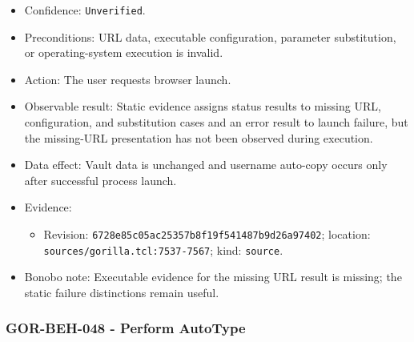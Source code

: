 \documentclass[
  letterpaper,
]{article}
\newcommand{\passthrough}[1]{#1}
\providecommand{\tightlist}{%
  \setlength{\itemsep}{0pt}\setlength{\parskip}{0pt}}
\begin{document}
\begin{itemize}
\tightlist
\item
  Confidence: \nolinkurl{Unverified}.
\item
  Preconditions: URL data, executable configuration, parameter substitution, or operating-system execution is invalid.
\item
  Action: The user requests browser launch.
\item
  Observable result: Static evidence assigns status results to missing URL, configuration, and substitution cases and an
  error result to launch failure, but the missing-URL presentation has not been observed during execution.
\item
  Data effect: Vault data is unchanged and username auto-copy occurs only after successful process launch.
\item
  Evidence:

  \begin{itemize}
  \tightlist
  \item
    Revision: \nolinkurl{6728e85c05ac25357b8f19f541487b9d26a97402}; location: \nolinkurl{sources/gorilla.tcl:7537-7567};
    kind: \passthrough{\lstinline!source!}.
  \end{itemize}
\item
  Bonobo note: Executable evidence for the missing URL result is missing; the static failure distinctions remain useful.
\end{itemize}

\subsubsection{GOR-BEH-048 - Perform AutoType}\label{gor-beh-048---perform-autotype}
\end{document}
